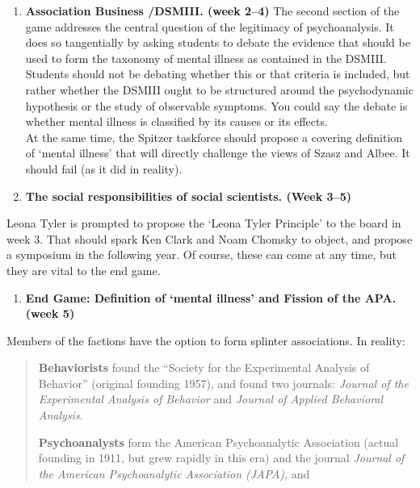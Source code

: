\begin{refsection}
\begin{enumerate}
\item \textbf{Association Business \slash  DSMIII. (week 2--4)}
The second section of the game addresses the central question of the legitimacy of psychoanalysis. It does so tangentially by asking students to debate the evidence that should be used to form the taxonomy of mental illness as contained in the DSMIII. Students should not be debating whether this or that criteria is included, but rather whether the DSMIII ought to be structured around the psychodynamic hypothesis or the study of observable symptoms. You could say the debate is whether mental illness is classified by its causes or its effects.\\
At the same time, the Spitzer taskforce should propose a covering definition of `mental illness' that will directly challenge the views of Szasz and Albee. It should fail (as it did in reality). 

\item \textbf{The social responsibilities of social scientists. (Week 3--5)} 

\end{enumerate}

Leona Tyler is prompted to propose the `Leona Tyler Principle' to the board in week 3. That should spark Ken Clark and Noam Chomsky to object, and propose a symposium in the following year. Of course, these can come at any time, but they are vital to the end game. 

\begin{enumerate}
\item \textbf{End Game: Definition of ‘mental illness’ and Fission of the APA. (week 5)}

\end{enumerate}

Members of the factions have the option to form splinter associations. In reality: 

\begin{quote}

\textbf{Behaviorists} found the “Society for the Experimental Analysis of Behavior” (original founding 1957), and found two journals: \emph{Journal of the Experimental Analysis of Behavior} and \emph{Journal of Applied Behavioral Analysis}. 

\textbf{Psychoanalysts} form the American Psychoanalytic Association (actual founding in 1911, but grew rapidly in this era) and the journal \emph{Journal of the American Psychoanalytic Association (JAPA)}, and 


\end{quote}
\end{refsection}
